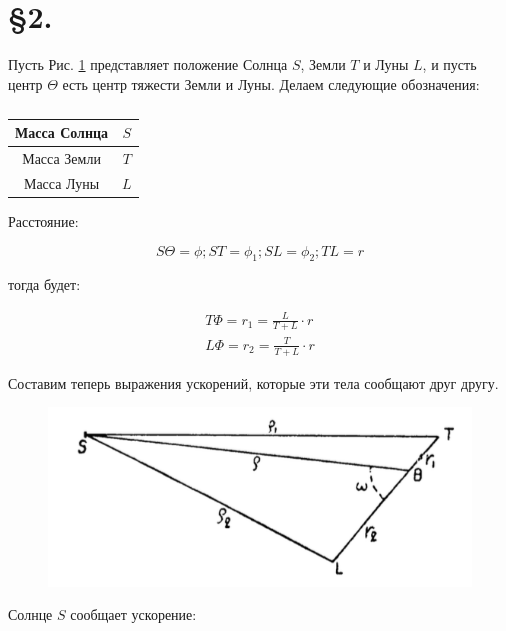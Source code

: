 \documentclass[a4paper,12pt]{article}
\begin{document}
\section*{\S 2.}

Пусть Рис. \ref{fg:21} представляет положение Солнца $S$, Земли $T$ и Луны $L$, и пусть центр $\Theta$ есть центр тяжести Земли и Луны. Делаем следующие обозначения:

\begin{table}[bhtp]
	\caption{}
	\begin{center}
	\begin{tabular}{|c|c|}
		\hline 
		Масса Солнца & $S$ \\ 
		\hline 
		Масса Земли & $T$ \\ 
		\hline 
		Масса Луны & $L$ \\ 
		\hline 
	\end{tabular} 
\end{center}
\end{table}

Расстояние:

\[
S \Theta = \phi; S T = \phi_1; S L = \phi_2; TL = r
\]

тогда будет:

\begin{equation}
\label{eq:1}
\begin{split}
T \Phi = r_1 = \frac{L}{T+L} \cdot r\\
L \Phi = r_2 = \frac{T}{T+L} \cdot r
\end{split}
\end{equation}

Составим теперь выражения ускорений, которые эти тела сообщают друг другу.

\begin{figure}
	\includegraphics[width=\linewidth]{21.png}
	\caption{}
	\label{fg:21}
\end{figure}

Солнце $S$ сообщает ускорение:
\end{document}
